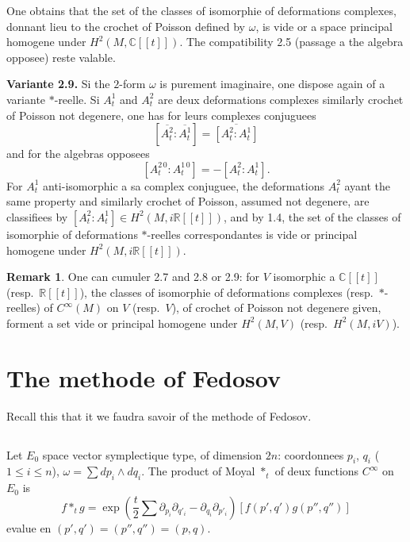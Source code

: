 \documentclass[11pt,a4paper]{article}
\theoremstyle{plain}
\theoremstyle{definition}
\newtheorem{remark}[theorem]{Remark}
\newcommand{\R}{\mathbb{R}}
\newcommand{\C}{\mathbb{C}}
\begin{document}
One obtains that the set of the classes of isomorphie of deformations complexes,
donnant lieu to the crochet of Poisson defined by $\omega$, is vide or a space principal homogene under $H^{2}(M, \C[[t]])$. The compatibility 2.5 (passage a the algebra opposee) reste valable.

\noindent \textbf{Variante 2.9.} Si the $2$-form $\omega$ is purement imaginaire, one dispose again of a
variante $*$-reelle. Si $A_{t}^{1}$ and $A_{t}^{2}$ are deux deformations complexes similarly crochet of Poisson not degenere, one has for leurs complexes conjuguees
\[
[\overline{A_{t}^{2}} : \overline{A_{t}^{1}}] = \overline{[A_{t}^{2} : A_{t}^{1}]}
\]
and for the algebras opposees
\[
[A_{t}^{2\,0} : A_{t}^{1\,0}] = -[A_{t}^{2} : A_{t}^{1}].
\]
For $A_{t}^{1}$ anti-isomorphic a sa complex conjuguee, the deformations $A_{t}^{2}$ ayant the same property and similarly crochet of Poisson, assumed not degenere, are classifiees by $[A_{t}^{2} : A_{t}^{1}] \in H^{2}(M, i\R[[t]])$, and by 1.4, the set of the classes of isomorphie of deformations $*$-reelles correspondantes is vide or principal homogene under $H^{2}(M, i\R[[t]])$.

\begin{remark}
One can cumuler 2.7 and 2.8 or 2.9: for $V$ isomorphic a $\C[[t]]$
(resp.~$\R[[t]]$), the classes of isomorphie of deformations complexes (resp.~$*$-reelles) of
$C^{\infty}(M)$ on $V$ (resp.~$V$), of crochet of Poisson not degenere given, forment a
set vide or principal homogene under $H^{2}(M, V)$ (resp.~$H^{2}(M, iV)$).
\end{remark}

\section{The methode of Fedosov}

Recall this that it we faudra savoir of the methode of Fedosov.

\subsection{}
Let $E_{0}$ space vector symplectique type, of dimension $2n$: coordonnees $p_{i}$,
$q_{i}$ ($1 \leq i \leq n$), $\omega = \sum dp_{i} \wedge dq_{i}$. The product of Moyal $*_{t}$ of deux functions $C^{\infty}$ on $E_{0}$
is
\[
f *_{t} g = \exp\left(\frac{t}{2} \sum \partial_{p_{i}} \partial_{q'_{i}} - \partial_{q_{i}} \partial_{p'_{i}}\right) [f(p',q') g(p'',q'')]
\]
evalue en $(p',q') = (p'',q'') = (p,q)$.
\end{document}
